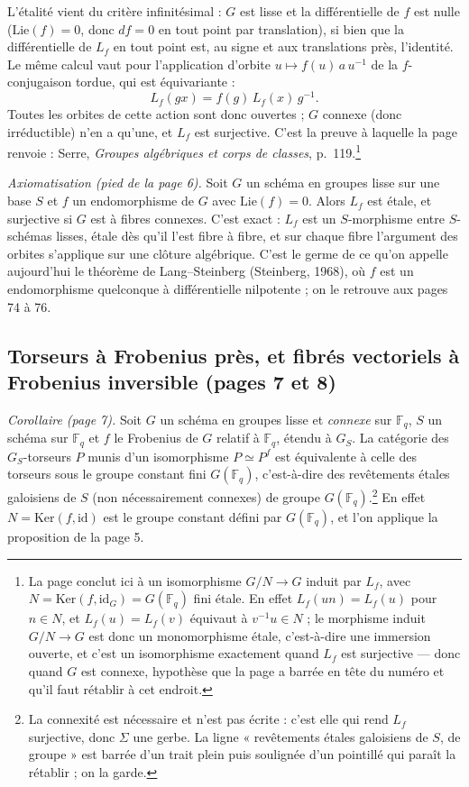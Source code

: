 \documentclass[11pt,a4paper]{article}
\begin{document}
L'étalité vient du critère infinitésimal : $G$ est lisse et la différentielle
de $f$ est nulle ($\mathrm{Lie}(f) = 0$, donc $df = 0$ en tout point par
translation), si bien que la différentielle de $L_f$ en tout point est, au
signe et aux translations près, l'identité. Le même calcul vaut pour
l'application d'orbite $u \mapsto f(u)\,a\,u^{-1}$ de la $f$-conjugaison
tordue, qui est équivariante :
\[
L_f(gx) = f(g)\,L_f(x)\,g^{-1}.
\]
Toutes les orbites de cette action sont donc ouvertes ; $G$ connexe (donc
irréductible) n'en a qu'une, et $L_f$ est surjective. C'est la preuve à
laquelle la page renvoie : Serre, \emph{Groupes algébriques et corps de
classes}, p.~119.\footnote{La page conclut ici à un isomorphisme $G/N \to G$
induit par $L_f$, avec $N = \mathrm{Ker}(f, \mathrm{id}_G) = G(\mathbb{F}_q)$
fini étale. En effet $L_f(un) = L_f(u)$ pour $n \in N$, et $L_f(u) = L_f(v)$
équivaut à $v^{-1}u \in N$ ; le morphisme induit $G/N \to G$ est donc un
monomorphisme étale, c'est-à-dire une immersion ouverte, et c'est un
isomorphisme exactement quand $L_f$ est surjective — donc quand $G$ est
connexe, hypothèse que la page a barrée en tête du numéro et qu'il faut
rétablir à cet endroit.}

\emph{Axiomatisation (pied de la page 6).} Soit $G$ un schéma en groupes lisse
sur une base $S$ et $f$ un endomorphisme de $G$ avec $\mathrm{Lie}(f) = 0$.
Alors $L_f$ est étale, et surjective si $G$ est à fibres connexes. C'est
exact : $L_f$ est un $S$-morphisme entre $S$-schémas lisses, étale dès qu'il
l'est fibre à fibre, et sur chaque fibre l'argument des orbites s'applique sur
une clôture algébrique. C'est le germe de ce qu'on appelle aujourd'hui le
théorème de Lang–Steinberg (Steinberg, 1968), où $f$ est un endomorphisme
quelconque à différentielle nilpotente ; on le retrouve aux pages 74 à 76.

\subsection*{Torseurs à Frobenius près, et fibrés vectoriels à Frobenius inversible (pages 7 et 8)}

\emph{Corollaire (page 7).} Soit $G$ un schéma en groupes lisse et
\emph{connexe} sur $\mathbb{F}_q$, $S$ un schéma sur $\mathbb{F}_q$ et $f$ le
Frobenius de $G$ relatif à $\mathbb{F}_q$, étendu à $G_S$. La catégorie des
$G_S$-torseurs $P$ munis d'un isomorphisme $P \simeq P^{f}$ est équivalente à
celle des torseurs sous le groupe constant fini $G(\mathbb{F}_q)$, c'est-à-dire
des revêtements étales galoisiens de $S$ (non nécessairement connexes) de
groupe $G(\mathbb{F}_q)$.\footnote{La connexité est nécessaire et n'est pas
écrite : c'est elle qui rend $L_f$ surjective, donc $\Sigma$ une gerbe. La
ligne « revêtements étales galoisiens de $S$, de groupe » est barrée d'un trait
plein puis soulignée d'un pointillé qui paraît la rétablir ; on la garde.}
En effet $N = \mathrm{Ker}(f, \mathrm{id})$ est le groupe constant défini par
$G(\mathbb{F}_q)$, et l'on applique la proposition de la page 5.
\end{document}
